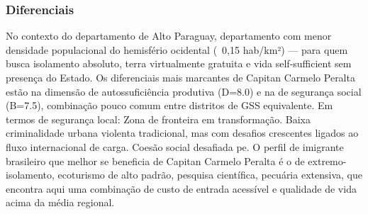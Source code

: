 \subsubsection*{Diferenciais}\label{dif-capitan-carmelo-peralta-1705}
No contexto do departamento de Alto Paraguay, departamento com menor densidade populacional do hemisfério ocidental (~0,15 hab/km²) — para quem busca isolamento absoluto, terra virtualmente gratuita e vida self-sufficient sem presença do Estado. Os diferenciais mais marcantes de Capitan Carmelo Peralta estão na dimensão de autossuficiência produtiva (D=8.0) e na de segurança social (B=7.5), combinação pouco comum entre distritos de GSS equivalente. Em termos de segurança local: Zona de fronteira em transformação. Baixa criminalidade urbana violenta tradicional, mas com desafios crescentes ligados ao fluxo internacional de carga. Coesão social desafiada pe. O perfil de imigrante brasileiro que melhor se beneficia de Capitan Carmelo Peralta é o de extremo-isolamento, ecoturismo de alto padrão, pesquisa científica, pecuária extensiva, que encontra aqui uma combinação de custo de entrada acessível e qualidade de vida acima da média regional.
